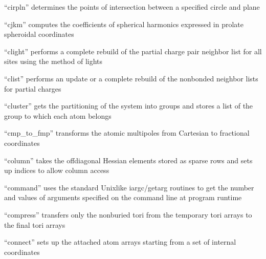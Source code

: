 \documentclass[letterpaper,11pt,english]{sphinxmanual}
\begin{document}

“cirpln” determines the points of intersection between a
specified circle and plane


“cjkm” computes the coefficients of spherical harmonics
expressed in prolate spheroidal coordinates


“clight” performs a complete rebuild of the partial charge
pair neighbor list for all sites using the method of lights







“clist” performs an update or a complete rebuild of the
nonbonded neighbor lists for partial charges


“cluster” gets the partitioning of the system into groups
and stores a list of the group to which each atom belongs


“cmp\_to\_fmp” transforms the atomic multipoles from Cartesian
to fractional coordinates


“column” takes the off\sphinxhyphen{}diagonal Hessian elements stored
as sparse rows and sets up indices to allow column access


“command” uses the standard Unix\sphinxhyphen{}like iargc/getarg routines
to get the number and values of arguments specified on the
command line at program runtime


“compress” transfers only the non\sphinxhyphen{}buried tori from
the temporary tori arrays to the final tori arrays


“connect” sets up the attached atom arrays
starting from a set of internal coordinates
\end{document}
